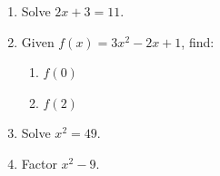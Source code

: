 \documentclass{article}\usepackage{enumitem}
\begin{document}
\begin{enumerate}[leftmargin=*, itemsep=4cm]
  \item Solve $2x + 3 = 11$. \ansline
  \item Given $f(x) = 3x^2 - 2x + 1$, find: \noansline
    \begin{enumerate}[label=(\alph*), itemsep=3cm]
      \item $f(0)$ \ansline
      \item $f(2)$ \ansline
    \end{enumerate}
  \item Solve $x^2 = 49$. \ansline
  \item Factor $x^2 - 9$. \ansline
\end{enumerate}
\end{document}
